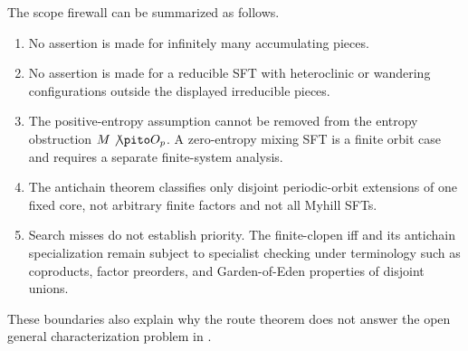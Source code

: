 The scope firewall can be summarized as follows.

\begin{enumerate}[label=(\alph*)]
  \item No assertion is made for infinitely many accumulating pieces.
  \item No assertion is made for a reducible SFT with heteroclinic or wandering
  configurations outside the displayed irreducible pieces.
  \item The positive-entropy assumption cannot be removed from the entropy
  obstruction $M\not\pito O_p$.  A zero-entropy mixing SFT is a finite orbit
  case and requires a separate finite-system analysis.
  \item The antichain theorem classifies only disjoint periodic-orbit
  extensions of one fixed core, not arbitrary finite factors and not all
  Myhill SFTs.
  \item Search misses do not establish priority.  The finite-clopen iff and
  its antichain specialization remain subject to specialist checking under
  terminology such as coproducts, factor preorders, and Garden-of-Eden
  properties of disjoint unions.
\end{enumerate}

These boundaries also explain why the route theorem does not answer the open
general characterization problem in
\cite[Section~9]{ceccheriniCoornaertSalo2026}.

